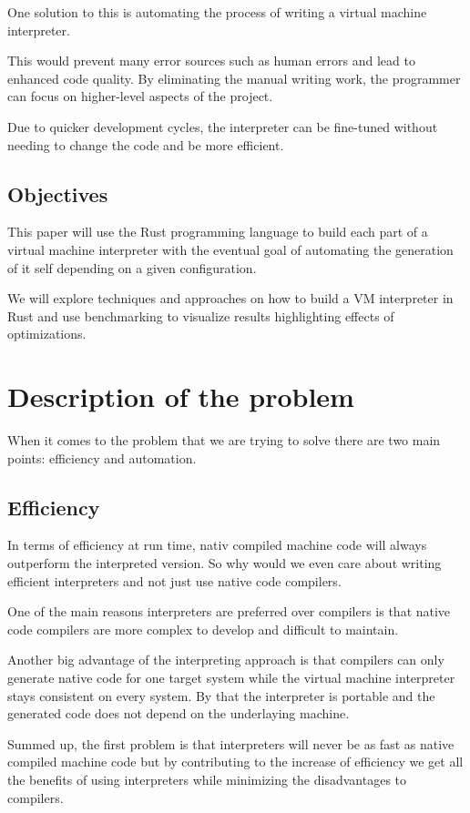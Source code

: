 \documentclass{article}
\begin{document}
One solution to this is automating the process of writing a virtual machine
interpreter.

This would prevent many error sources such as human errors and lead to enhanced
code quality. By eliminating the manual writing work, the programmer can focus
on higher-level aspects of the project.

Due to quicker development cycles, the interpreter can be fine-tuned without
needing to change the code and be more efficient.

\subsection{Objectives}
This paper will use the Rust programming language to build each part of a virtual machine 
interpreter with the eventual goal of automating the generation of it self depending on
a given configuration.

We will explore techniques and approaches on how to build a VM interpreter in
Rust and use benchmarking to visualize results highlighting effects of
optimizations.

\section{Description of the problem}
When it comes to the problem that we are trying to solve there are two main
points: efficiency and automation.

\subsection{Efficiency}
In terms of efficiency at run time, nativ compiled machine code will always
outperform the interpreted version. So why would we even care about writing
efficient interpreters and not just use native code compilers.

One of the main reasons interpreters are preferred over compilers is that 
native code compilers are more complex to develop and difficult to maintain.
~\cite{structure_and_performance}

Another big advantage of the interpreting approach is that compilers can only
generate native code for one target system while the virtual machine
interpreter stays consistent on every system. By that the interpreter is
portable and the generated code does not depend on the underlaying machine.

Summed up, the first problem is that interpreters will never be as fast as
native compiled machine code but by contributing to the increase of efficiency
we get all the benefits of using interpreters while minimizing the
disadvantages to compilers.
\end{document}
